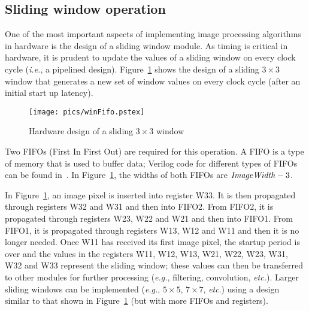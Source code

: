 \documentclass[10pt,twocolumn,letterpaper]{article}
\begin{document}
\subsection{Sliding window operation}
\label{sec:slideWin}
One of the most important aspects of implementing image processing algorithms in hardware is the
design of a sliding window module.
As timing is critical in hardware, it is prudent to 
update the values of a sliding window on every clock cycle (\emph{i.e.}, a pipelined design).
Figure~\ref{fig:winFifo} shows the design of a sliding $3\times3$ window that generates a new set of window
values on every clock cycle (after an initial start up latency).
\begin{figure}[!htb]
\begin{center}
\setlength{\abovecaptionskip}{-0.25cm}
        \texttt{[image: pics/winFifo.pstex]}
        \caption{Hardware design of a sliding $3\times3$ window}
        \label{fig:winFifo}
\setlength{\abovecaptionskip}{0cm}
\end{center}
\end{figure}
Two FIFOs (First In First Out) are required for this operation.
A FIFO is a type of memory that is used to buffer data;
Verilog code for different types of FIFOs can be found in~\cite{zeidbk}.
In Figure~\ref{fig:winFifo}, the widths of both FIFOs are $\mbox{\emph{ImageWidth}} - 3$.

In Figure~\ref{fig:winFifo}, an image pixel is inserted into register W33. It is then propagated through
registers W32 and W31 and then into FIFO2. From FIFO2, it is propagated through registers W23, W22 and
W21 and then into FIFO1. From FIFO1, it is propagated through registers W13, W12 and W11 and then it is no longer needed.
Once W11 has received its first image pixel, the startup period is over and 
the values in the registers W11, W12, W13, W21, W22, W23, W31, W32 and W33 represent the sliding window; 
these values can then be transferred to other modules for further processing (\emph{e.g.}, filtering, convolution, \emph{etc.}).
Larger sliding windows can be implemented (\emph{e.g.}, $5\times5$, $7\times7$, \emph{etc}.) using a design similar to that shown 
in Figure~\ref{fig:winFifo} (but with more FIFOs and registers).
\end{document}
